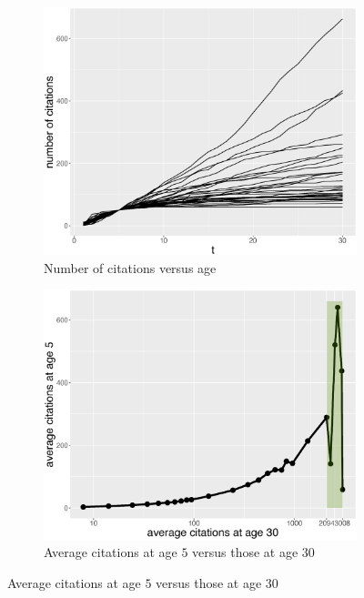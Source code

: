 \begin{figure}[ht!]
    \centering
    \begin{subfigure}[b]{0.48\textwidth}
     \centering
     \includegraphics[width=\textwidth]{figures/pred_power/cit_t.eps}
     \caption{Number of citations versus age}
     \label{fig:pred_cit_age}
    \end{subfigure}
    \hfill
    \begin{subfigure}[b]{0.48\textwidth}
     \centering
     \includegraphics[width=\textwidth]{figures/pred_power/cit_cit.eps}
     \caption{Average citations at age $5$ versus those at age $30$}

\end{subfigure}
\end{figure}
